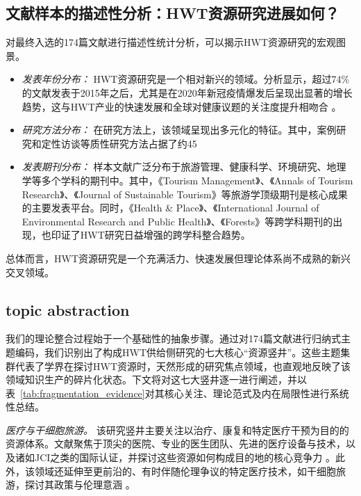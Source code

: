 \documentclass[UTF8, 12pt, a4paper, twoside]{ctexart}
\begin{document}
\subsection{文献样本的描述性分析：HWT资源研究进展如何？}
对最终入选的174篇文献进行描述性统计分析，可以揭示HWT资源研究的宏观图景。
\begin{itemize}[leftmargin=*, nosep]
    \item \textit{发表年份分布：} HWT资源研究是一个相对新兴的领域。分析显示，超过74\%的文献发表于2015年之后，尤其是在2020年新冠疫情爆发后呈现出显著的增长趋势，这与HWT产业的快速发展和全球对健康议题的关注度提升相吻合 \parencite{aluculeseiFutureTrendsMedical2021, figueiredoMappingSustainableDevelopment2024}。
    \item \textit{研究方法分布：} 在研究方法上，该领域呈现出多元化的特征。其中，案例研究和定性访谈等质性研究方法占据了约45%
    \item \textit{发表期刊分布：} 样本文献广泛分布于旅游管理、健康科学、环境研究、地理学等多个学科的期刊中。其中，《Tourism Management》、《Annals of Tourism Research》、《Journal of Sustainable Tourism》等旅游学顶级期刊是核心成果的主要发表平台。同时，《Health \& Place》、《International Journal of Environmental Research and Public Health》、《Forests》等跨学科期刊的出现，也印证了HWT研究日益增强的跨学科整合趋势。
\end{itemize}
总体而言，HWT资源研究是一个充满活力、快速发展但理论体系尚不成熟的新兴交叉领域。


\subsection{topic abstraction}

我们的理论整合过程始于一个基础性的抽象步骤。通过对174篇文献进行归纳式主题编码，我们识别出了构成HWT供给侧研究的七大核心“资源竖井”。这些主题集群代表了学界在探讨HWT资源时，天然形成的研究焦点领域，也直观地反映了该领域知识生产的碎片化状态。下文将对这七大竖井逐一进行阐述，并以表~\ref{tab:fragmentation_evidence}对其核心关注、理论范式及内在局限性进行系统性总结。

\textit{医疗与干细胞旅游。} 该研究竖井主要关注以治疗、康复和特定医疗干预为目的的资源体系。文献聚焦于顶尖的医院、专业的医生团队、先进的医疗设备与技术，以及诸如JCI之类的国际认证，并探讨这些资源如何构成目的地的核心竞争力 \parencite{connell2006medical, ganguli2017qualitative, ayuningtyasStrategicRoleInformation2020}。此外，该领域还延伸至更前沿的、有时伴随伦理争议的特定医疗技术，如干细胞旅游，探讨其政策与伦理意涵 \parencite{einsiedelSTEMCELLTOURISM2012}。
\end{document}
